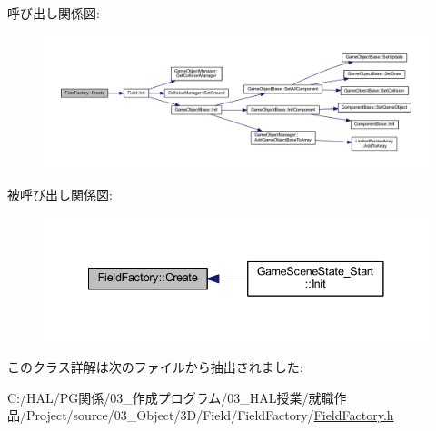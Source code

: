 呼び出し関係図\+:\nopagebreak
\begin{figure}[H]
\begin{center}
\leavevmode
\includegraphics[width=350pt]{class_field_factory_a7e2a9847756bbb43f9942a219cc69125_cgraph}
\end{center}
\end{figure}
被呼び出し関係図\+:\nopagebreak
\begin{figure}[H]
\begin{center}
\leavevmode
\includegraphics[width=341pt]{class_field_factory_a7e2a9847756bbb43f9942a219cc69125_icgraph}
\end{center}
\end{figure}


このクラス詳解は次のファイルから抽出されました\+:\begin{DoxyCompactItemize}
\item 
C\+:/\+H\+A\+L/\+P\+G関係/03\+\_\+作成プログラム/03\+\_\+\+H\+A\+L授業/就職作品/\+Project/source/03\+\_\+\+Object/3\+D/\+Field/\+Field\+Factory/\mbox{\hyperlink{_field_factory_8h}{Field\+Factory.\+h}}\end{DoxyCompactItemize}
